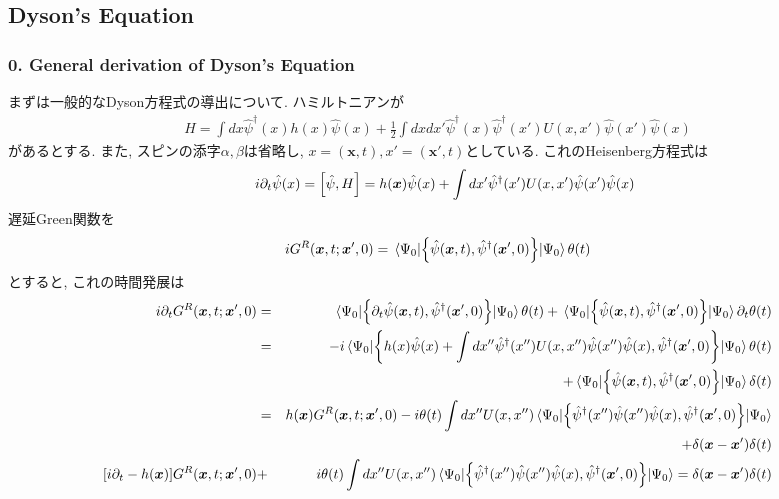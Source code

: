 \documentclass[10.5pt,a4paper]{jreport}
\newcommand{\bx}{\bm{x}}
\newcommand{\hpsi}{\hat{\psi}}
\begin{document}
\subsection{Dyson's Equation}
\subsubsection{0. General derivation of Dyson's Equation}
まずは一般的なDyson方程式の導出について. ハミルトニアンが
\begin{eqnarray}
  H = \int dx\hpsi^\dagger(x) h(x)\hpsi(x) + \frac{1}{2}\int dxdx'\hpsi^\dagger(x)\hpsi^\dagger(x')U(x, x')\hpsi(x')\hpsi(x)
\end{eqnarray}
があるとする. また, スピンの添字$\alpha, \beta$は省略し, $x = (\bx, t), x' = (\bx', t)$としている. これのHeisenberg方程式は
\begin{eqnarray}
 && i\partial_t\hpsi(x) = \qty[\hpsi, H] = h(\bx)\hpsi(x) + \int dx'\hpsi^\dagger(x')U(x, x')\hpsi(x')\hpsi(x)\\
\end{eqnarray}
遅延Green関数を
\begin{eqnarray}
  iG^R(\bx, t; \bx', 0) = \ev{\qty{\hpsi(\bx, t), \hpsi^\dagger(\bx', 0)}}{\Psi_0}\theta(t)
\end{eqnarray}
とすると, これの時間発展は
\begin{eqnarray}
\nonumber  i\partial_tG^R(\bx, t; \bx', 0) &=& \ev{\qty{\partial_t\hpsi(\bx, t), \hpsi^\dagger(\bx', 0)}}{\Psi_0}\theta(t) + \ev{\qty{\hpsi(\bx, t), \hpsi^\dagger(\bx', 0)}}{\Psi_0}\partial_t\theta(t)\\
\nonumber  &=& -i\ev{\qty{h(x)\hpsi(x) + \int dx''\hpsi^\dagger(x'')U(x, x'')\hpsi(x'')\hpsi(x), \hpsi^\dagger(\bx', 0)}}{\Psi_0}\theta(t)\\
\nonumber&& + \ev{\qty{\hpsi(\bx, t), \hpsi^\dagger(\bx', 0)}}{\Psi_0}\delta(t)\\
\nonumber  &=&h(\bx)G^R(\bx, t; \bx', 0) -i\theta(t)\int dx''U(x, x'')\ev{\qty{\hpsi^\dagger(x'')\hpsi(x'')\hpsi(x), \hpsi^\dagger(\bx', 0)}}{\Psi_0}\\
\nonumber&& +\delta(\bx-\bx')\delta(t)\\
\nonumber\qty[i\partial_t -h(\bx)]G^R(\bx, t; \bx', 0) &+&i\theta(t)\int dx''U(x, x'')\ev{\qty{\hpsi^\dagger(x'')\hpsi(x'')\hpsi(x), \hpsi^\dagger(\bx', 0)}}{\Psi_0}  = \delta(\bx-\bx')\delta(t)\\
\end{eqnarray}
\end{document}
